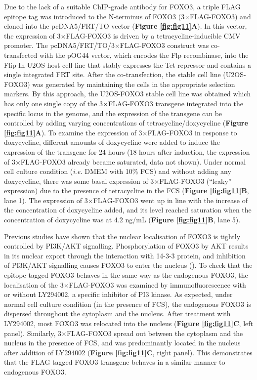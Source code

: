 Due to the lack of a suitable ChIP-grade antibody for FOXO3, a triple FLAG epitope tag was introduced to the N-terminus of FOXO3 (3$\times$FLAG-FOXO3) and cloned into the pcDNA5/FRT/TO vector (\textbf{Figure \ref{fig:fig11}A}). In this vector, the expression of 3$\times$FLAG-FOXO3 is driven by a tetracycline-inducible CMV promoter. The pcDNA5/FRT/TO/3$\times$FLAG-FOXO3 construct was co-transfected with the pOG44 vector, which encodes the Flp recombinase, into the Flip-In U2OS host cell line that stably expresses the Tet repressor and contains a single integrated FRT site. After the co-transfection, the stable cell line (U2OS-FOXO3) was generated by maintaining the cells in the appropriate selection markers. By this approach, the U2OS-FOXO3 stable cell line was obtained which has only one single copy of the 3$\times$FLAG-FOXO3 transgene integrated into the specific locus in the genome, and the expression of the transgene can be controlled by adding varying concentrations of tetracycline/doxycycline (\textbf{Figure \ref{fig:fig11}A}). To examine the expression of 3$\times$FLAG-FOXO3 in response to doxycycline, different amounts of doxycycline were added to induce the expression of the transgene for 24 hours (18 hours after induction, the expression of 3$\times$FLAG-FOXO3 already became saturated, data not shown). Under normal cell culture condition (\textit{i.e.} DMEM with 10\% FCS) and without adding any doxycycline, there was some basal expression of 3$\times$FLAG-FOXO3 (\enquote{leaky} expression) due to the presence of tetracycline in the FCS (\textbf{Figure \ref{fig:fig11}B}, lane 1). The expression of 3$\times$FLAG-FOXO3 went up in line with the increase of the concentration of doxycycline added, and its level reached saturation when the concentration of doxycycline was at 4.2 ng/mL (\textbf{Figure \ref{fig:fig11}B}, lane 5).

Previous studies have shown that the nuclear localisation of FOXO3 is tightly controlled by PI3K/AKT signalling. Phosphorylation of FOXO3 by AKT results in its nuclear export through the interaction with 14-3-3 protein, and inhibition of PI3K/AKT signalling causes FOXO3 to enter the nucleus (\cite{brunet1999akt}). To check that the epitope-tagged FOXO3 behaves in the same way as the endogenous FOXO3, the localisation of the 3$\times$FLAG-FOXO3 was examined by immunofluorescence with or without LY294002, a specific inhibitor of PI3 kinase. As expected, under normal cell culture condition (in the presence of FCS), the endogenous FOXO3 is dispersed throughout the cytoplasm and the nucleus. After treatment with LY294002, most FOXO3 was relocated into the nucleus (\textbf{Figure \ref{fig:fig11}C}, left panel). Similarly, 3$\times$FLAG-FOXO3 spread out between the cytoplasm and the nucleus in the presence of FCS, and was predominantly located in the nucleus after addition of LY294002 (\textbf{Figure \ref{fig:fig11}C}, right panel). This demonstrates that the FLAG tagged FOXO3 transgene behaves in a similar manner to endogenous FOXO3.

